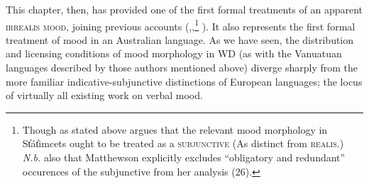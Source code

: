 This chapter, then, has provided one of the first formal treatments of an apparent \textsc{irrealis mood}, joining previous accounts (\citealp[\textit{e.g.},][]{Krifka2016},\citealp{Matthewson2010},\footnote{Though as stated above \citet[13]{Matthewson2010} argues that the relevant mood morphology in  St̓át̓imcets ought to be treated as a \textsc{subjunctive} (As distinct from \textsc{realis}.) \textit{N.b.} also that Matthewson explicitly excludes ``obligatory and redundant'' occurences of the subjunctive from her analysis (26).} \citealp{VonPrince2018}). It also represents the first formal treatment of mood in an Australian language. As we have seen, the distribution and licensing conditions of mood morphology in WD (as with the Vanuatuan languages described by those authors mentioned above) diverge sharply from the more familiar indicative-subjunctive distinctions of European languages; the locus of virtually all existing work on verbal mood. 







